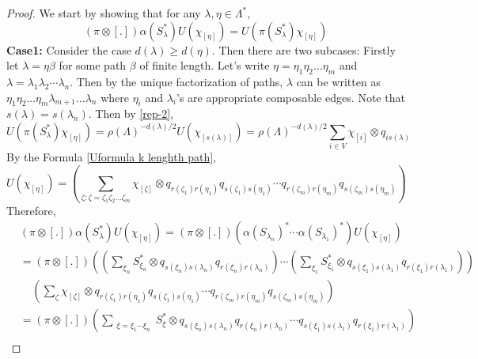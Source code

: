 \documentclass{amsart}
\theoremstyle{plain}
\theoremstyle{definition}
\theoremstyle{remark}
\numberwithin{equation}{section}
\begin{document}
\begin{proof}
We start by showing that for any $\lambda,\eta\in\Lambda^{\ast}$, 
\begin{equation}
\label{implementation_equation}
   (\pi\otimes [.]) \alpha(S_{\lambda}^{\ast})U(\chi_{[\eta]})=U(\pi(S_{\lambda}^{\ast})\chi_{[\eta]})
\end{equation}
 \textbf{Case1:} Consider the case $d(\lambda)\geq d(\eta)$. Then there are two subcases: Firstly let $\lambda=\eta\beta$ for some path $\beta$ of finite length. Let's write $\eta=\eta_{1}\eta_{2}\ldots\eta_{m}$ and $\lambda=\lambda_{1}\lambda_{2}\cdots\lambda_{n}$. Then by the unique factorization of paths, $\lambda$ can be written as $\eta_{1}\eta_{2}\ldots\eta_{m}\lambda_{m+1}\ldots\lambda_{n}$ where $\eta_{i}$ and $\lambda_{i}$'s are appropriate composable edges. Note that $s(\lambda)=s(\lambda_{n})$. Then by \ref{rep-2},  
\begin{displaymath}
U(\pi(S_{\lambda}^{\ast})\chi_{[\eta]})=\rho(\Lambda)^{-d(\lambda)/2}U(\chi_{[s(\lambda)]})=\rho(\Lambda)^{-d(\lambda)/2}\sum\limits_{i\in V}\chi_{[i]}\otimes q_{is(\lambda)}\end{displaymath}
 By the Formula \ref{Uformula k lenghth path},
\begin{displaymath}
U(\chi_{[\eta]})=\left(\sum\limits_{\zeta:\zeta=\zeta_{1}\zeta_{2}\ldots\zeta_{m}}\chi_{[\zeta]}\otimes q_{r(\zeta_{1})r(\eta_{1})}q_{s(\zeta_{1})s(\eta_{1})}\cdots q_{r(\zeta_{m})r(\eta_{m})}q_{s(\zeta_{m})s(\eta_{m})}\right)
\end{displaymath}
Therefore, 
\begin{equation*}
    \begin{aligned}
        &(\pi\otimes [.]) \alpha(S_{\lambda}^{\ast})U(\chi_{[\eta]})=  (\pi\otimes [.])(\alpha(S_{\lambda_{n}})^{\ast}\cdots \alpha(S_{\lambda_{1}})^{\ast}) U(\chi_{[\eta]})\\
&=(\pi\otimes [.])\left(\left(\sum\limits_{\xi_{n}}S_{\xi_{n}}^{*}\otimes q_{s(\xi_{n})s(\lambda_{n})}q_{r(\xi_{n})r(\lambda_{n})}\right)\cdots \left(\sum\limits_{\xi_{1}}S_{\xi_{1}}^{\ast}\otimes q_{s(\xi_{1})s(\lambda_{1})}q_{r(\xi_{1})r(\lambda_{1})}\right)\right)\\
&\;\;\;\;\left(\sum\limits_{\zeta}\chi_{[\zeta]}\otimes q_{r(\zeta_{1})r(\eta_{1})}q_{s(\zeta_{1})s(\eta_{1})}\cdots q_{r(\zeta_{m})r(\eta_{m})}q_{s(\zeta_{m})s(\eta_{m})}\right)\\
&=(\pi\otimes [.])\left(\sum\limits_{\substack{\xi=\xi_{1}\cdots\xi_{n}}}S_{\xi}^{*}\otimes q_{s(\xi_{n})s(\lambda_{n})}q_{r(\xi_{n})r(\lambda_{n})}\cdots  q_{s(\xi_{1})s(\lambda_{1})}q_{r(\xi_{1})r(\lambda_{1})} \right)\\

\end{aligned}
\end{equation*}
\end{proof}
\end{document}
